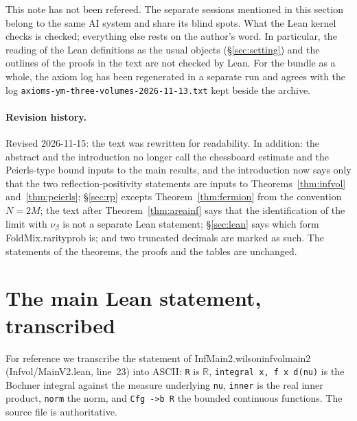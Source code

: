 \documentclass[11pt,a4paper]{article}
\theoremstyle{definition}
\theoremstyle{remark}
\newcommand{\leanus}{\textunderscore\allowbreak{}}
\newcommand{\leandot}{.\allowbreak{}}
\newcommand{\leansl}{/\allowbreak{}}
\newcommand{\lean}[1]{{\ttfamily\let\_\leanus #1}}
\newcommand{\R}{\mathbb{R}}
\begin{document}
This note has not been refereed. The separate sessions mentioned in this section belong to the same AI system and share its blind spots. What the Lean kernel checks is checked; everything else rests on the author's word. In particular, the reading of the Lean definitions as the usual objects (\S\ref{sec:setting}) and the outlines of the proofs in the text are not checked by Lean. For the bundle as a whole, the axiom log has been regenerated in a separate run and agrees with the log \texttt{axioms-\allowbreak{}ym-three-volumes-\allowbreak{}2026-11-13.txt} kept beside the archive.

\paragraph{Revision history.} Revised 2026-11-15: the text was rewritten for readability. In addition: the abstract and the introduction no longer call the chessboard estimate and the Peierls-type bound inputs to the main results, and the introduction now says only that the two reflection-positivity statements are inputs to Theorems~\ref{thm:infvol} and~\ref{thm:peierls}; \S\ref{sec:rp} excepts Theorem~\ref{thm:fermion} from the convention $N=2M$; the text after Theorem~\ref{thm:areainf} says that the identification of the limit with $\nu_\beta$ is not a separate Lean statement; \S\ref{sec:lean} says which form \lean{FoldMix\leandot{}rarity\_prob} is; and two truncated decimals are marked as such. The statements of the theorems, the proofs and the tables are unchanged.

\appendix
\section{The main Lean statement, transcribed}\label{app:main}

For reference we transcribe the statement of \lean{InfMain2\leandot{}wilson\_infvol\_main2} (\lean{Infvol\leansl{}MainV2\leandot{}lean}, line~23) into ASCII: \texttt{R} is $\R$, \texttt{integral x, f x d(nu)} is the Bochner integral against the measure underlying \texttt{nu}, \texttt{inner} is the real inner product, \texttt{norm} the norm, and \texttt{Cfg ->b R} the bounded continuous functions. The source file is authoritative.
\end{document}
